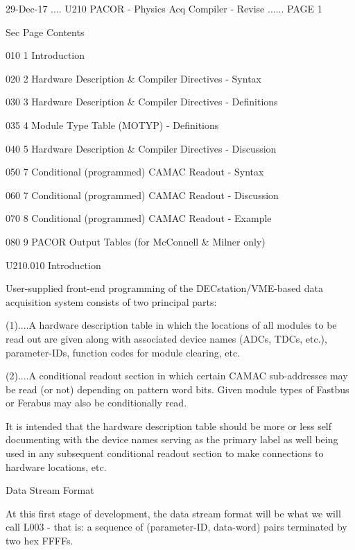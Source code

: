    29-Dec-17 .... U210  PACOR -  Physics Acq Compiler - Revise ...... PAGE   1
 
 
 
   Sec Page Contents
 
   010   1  Introduction
 
   020   2  Hardware Description & Compiler Directives - Syntax
 
   030   3  Hardware Description & Compiler Directives - Definitions
 
   035   4  Module Type Table (MOTYP)                  - Definitions
 
   040   5  Hardware Description & Compiler Directives - Discussion
 
   050   7  Conditional (programmed) CAMAC Readout     - Syntax
 
   060   7  Conditional (programmed) CAMAC Readout     - Discussion
 
   070   8  Conditional (programmed) CAMAC Readout     - Example
 
   080   9  PACOR Output Tables (for McConnell & Milner only)
 
 
   U210.010  Introduction
 
   User-supplied  front-end  programming  of  the  DECstation/VME-based   data
   acquisition system consists of two principal parts:
 
   (1)....A  hardware  description table in which the locations of all modules
          to be read out are given along with associated device  names  (ADCs,
          TDCs, etc.), parameter-IDs, function codes for module clearing, etc.
 
 
   (2)....A  conditional  readout section in which certain CAMAC sub-addresses
          may be read (or not) depending on pattern word  bits.  Given  module
          types of Fastbus or Ferabus may also be conditionally read.
 
   It  is  intended that the hardware description table should be more or less
   self documenting with the device names serving as the primary label as well
   being   used   in  any  subsequent  conditional  readout  section  to  make
   connections to hardware locations, etc.
 
                               Data Stream Format
 
   At this first stage of development, the data stream format will be what  we
   will  call  L003  -  that is: a sequence of (parameter-ID, data-word) pairs
   terminated by two hex FFFFs.
 
